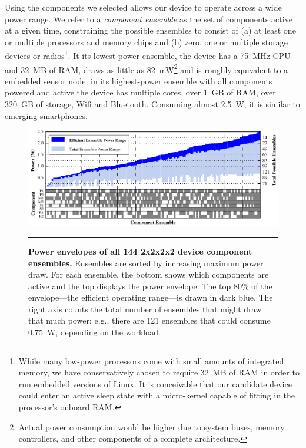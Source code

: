 Using the components we selected allows our device to operate across a wide
power range. We refer to a \textit{component ensemble} as the set of
components active at a given time, constraining the possible ensembles to
consist of (a) at least one or multiple processors and memory chips and (b)
zero, one or multiple storage devices or radios\footnote{While many low-power
processors come with small amounts of integrated memory, we have
conservatively chosen to require 32~MB of RAM in order to run embedded
versions of Linux. It is conceivable that our candidate device could enter an
active sleep state with a micro-kernel capable of fitting in the processor's
onboard RAM.}. It its lowest-power ensemble, the device has a 75~MHz CPU and
32~MB of RAM, draws as little as 82~mW\footnote{Actual power consumption
would be higher due to system buses, memory controllers, and other components
of a complete architecture.} and is roughly-equivalent to a embedded sensor
node; in its highest-power ensemble with all components powered and active
the device has multiple cores, over 1~GB of RAM, over 320~GB of storage, Wifi
and Bluetooth. Consuming almost 2.5~W, it is similar to emerging smartphones.

\begin{figure}[t]
\includegraphics{./figures/componentgraph.pdf}

\caption{\small \textbf{Power envelopes of all 144 2x2x2x2 device component
ensembles.} Ensembles are sorted by increasing maximum power draw. For each
ensemble, the bottom shows which components are active and the top displays
the power envelope. The top 80\% of the envelope---the efficient operating
range---is drawn in dark blue. The right axis counts the total number of
ensembles that might draw that much power: e.g., there are
121 ensembles that could consume 0.75~W, depending on the workload.}
\vspace{0.10in}
\hrule
\vspace{-0.20in}
\label{figure-componentgraph}
\end{figure}


